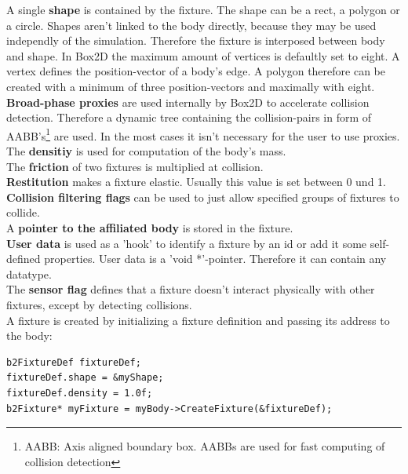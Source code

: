 \documentclass[10pt,a4paper,DIV=11]{scrreprt}
\begin{document}
A single \textbf{shape} is contained by the fixture. The shape can be a rect, a polygon or a circle. Shapes aren't linked to the body directly, because they may be used independly of the simulation. Therefore the fixture is interposed between body and shape. In Box2D the maximum amount of vertices is defaultly set to eight. A vertex defines the position-vector of a body's edge. A polygon therefore can be created with a minimum of three position-vectors and maximally with eight.
\\

\textbf{Broad-phase proxies} are used internally by Box2D to accelerate collision detection. Therefore a dynamic tree containing the collision-pairs in form of AABB's\footnote{AABB: Axis aligned boundary box. AABBs are used for fast computing of collision detection} are used. In the most cases it isn't necessary for the user to use proxies. \\

The \textbf{densitiy} is used for computation of the body's mass.\\

The \textbf{friction} of two fixtures is multiplied at collision. \\

\textbf{Restitution} makes a fixture elastic. Usually this value is set between 0 und 1. \\

\textbf{Collision filtering flags} can be used to just allow specified groups of fixtures to collide. \\

A \textbf{pointer to the affiliated body} is stored in the fixture.\\

\textbf{User data} is used as a 'hook' to identify a fixture by an id or add it some self-defined properties. User data is a 'void *'-pointer. Therefore it can contain any datatype. \\

The \textbf{sensor flag} defines that a fixture doesn't interact physically with other fixtures, except by detecting collisions. \\



A fixture is created by initializing a fixture definition and passing its address to the body:

\begin{lstlisting}[caption={Creation of a fixture (source Box2D manual)},label=lst:fixture-create]
b2FixtureDef fixtureDef;
fixtureDef.shape = &myShape;
fixtureDef.density = 1.0f;
b2Fixture* myFixture = myBody->CreateFixture(&fixtureDef);
\end{lstlisting}
\end{document}
